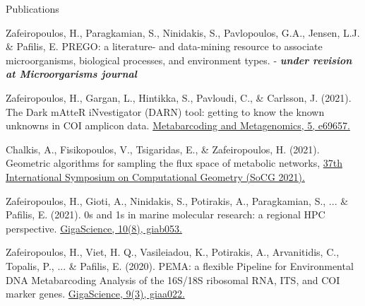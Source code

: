 \documentclass{beamer}
\begin{document}
   \begin{frame}[label=bibliography]{Publications}
      
      \begin{thebibliography}{9}

         \scriptsize
            Zafeiropoulos, H., Paragkamian, S., Ninidakis, S., Pavlopoulos, G.A., Jensen, L.J. \& Pafilis, E. PREGO: a literature- and data-mining resource to associate microorganisms, biological processes, and environment types. - \textbf{\textit{under revision at Microorgarisms journal}}


         \scriptsize
            Zafeiropoulos, H., Gargan, L., Hintikka, S., Pavloudi, C., \& Carlsson, J. (2021). The Dark mAtteR iNvestigator (DARN) tool: getting to know the known unknowns in COI amplicon data. \href{https://mbmg.pensoft.net/article/69657/list/9/}{Metabarcoding and Metagenomics, 5, e69657.}
         \scriptsize

            Chalkis, A., Fisikopoulos, V., Tsigaridas, E., \& Zafeiropoulos, H. (2021). Geometric algorithms for sampling the flux space of metabolic networks, \href{ https://drops.dagstuhl.de/opus/volltexte/2021/13820/}{37th International Symposium on Computational Geometry (SoCG 2021).}

         \scriptsize
            Zafeiropoulos, H., Gioti, A., Ninidakis, S., Potirakis, A., Paragkamian, S., ... \& Pafilis, E. (2021). 0s and 1s in marine molecular research: a regional HPC perspective. \href{https://academic.oup.com/gigascience/article/10/8/giab053/6353916}{GigaScience, 10(8), giab053.}

         \scriptsize
            Zafeiropoulos, H., Viet, H. Q., Vasileiadou, K., Potirakis, A., Arvanitidis, C., Topalis, P., ... \& Pafilis, E. (2020). PEMA: a flexible Pipeline for Environmental DNA Metabarcoding Analysis of the 16S/18S ribosomal RNA, ITS, and COI marker genes. \href{https://academic.oup.com/gigascience/article/9/3/giaa022/5803335}{GigaScience, 9(3), giaa022.}
 
      \end{thebibliography}
   \end{frame}
\end{document}
